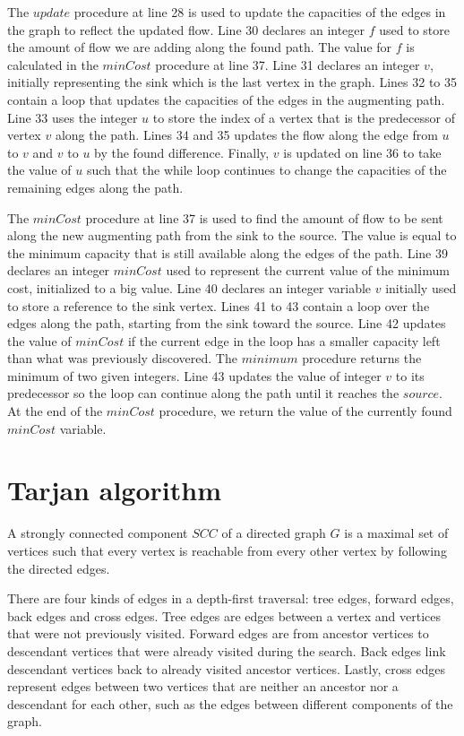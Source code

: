 \documentclass{l4proj}
\begin{document}
\noindent The $update$ procedure at line 28 is used to update the capacities of the edges in the graph to reflect the updated flow. Line 30 declares an integer $f$ used to store the amount of flow we are adding along the found path. The value for $f$ is calculated in the $minCost$ procedure at line 37. Line 31 declares an integer $v$, initially representing the sink which is the last vertex in the graph. Lines 32 to 35 contain a loop that updates the capacities of the edges in the augmenting path. Line 33 uses the integer $u$ to store the index of a vertex that is the predecessor of vertex $v$ along the path. Lines 34 and 35 updates the flow along the edge from $u$ to $v$ and $v$ to $u$ by the found difference. Finally, $v$ is updated on line 36 to take the value of $u$ such that the while loop continues to change the capacities of the remaining edges along the path.

\noindent The $minCost$ procedure at line 37 is used to find the amount of flow to be sent along the new augmenting path from the sink to the source. The value is equal to the minimum capacity that is still available along the edges of the path. Line 39 declares an integer $minCost$ used to represent the current value of the minimum cost, initialized to a big value. Line 40 declares an integer variable $v$ initially used to store a reference to the sink vertex. Lines 41 to 43 contain a loop over the edges along the path, starting from the sink toward the source. Line 42 updates the value of $minCost$ if the current edge in the loop has a smaller capacity left than what was previously discovered. The $minimum$ procedure returns the minimum of two given integers. Line 43 updates the value of integer $v$ to its predecessor so the loop can continue along the path until it reaches the $source$. At the end of the $minCost$ procedure, we return the value of the currently found $minCost$ variable.

\newpage

\section{Tarjan algorithm}
\noindent A strongly connected component $SCC$ of a directed graph $G$ is a maximal set of vertices such that every vertex is reachable from every other vertex by following the directed edges.

\noindent There are four kinds of edges in a depth-first traversal: tree edges, forward edges, back edges and cross edges. Tree edges are edges between a vertex and vertices that were not previously visited. Forward edges are from ancestor vertices to descendant vertices that were already visited during the search. Back edges link descendant vertices back to already visited ancestor vertices. Lastly, cross edges represent edges between two vertices that are neither an ancestor nor a descendant for each other, such as the edges between different components of the graph. 
\end{document}
